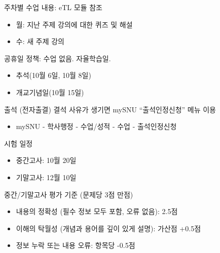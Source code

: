 \documentclass[11pt, aspectratio=169]{beamer}
\begin{document}
\begin{frame}[t]{}
  \begin{block}{주차별 수업 내용: eTL 모듈 참조}
    \begin{itemize}
      \item 월: 지난 주제 강의에 대한 퀴즈 및 해설
      \item 수: 새 주제 강의
    \end{itemize}     
  \end{block}

  \begin{block}{공휴일 정책: 수업 없음. 자율학습일.}
    \begin{itemize}
      \item 추석(10월 6일, 10월 8일)
      \item 개교기념일(10월 15일)
    \end{itemize}      
  \end{block}
  \begin{block}{출석 (전자출결)}
    결석 사유가 생기면 mySNU “출석인정신청” 메뉴 이용
    \begin{itemize}
      \item mySNU - 학사행정 - 수업/성적 - 수업 - 출석인정신청
    \end{itemize}
  \end{block}

\end{frame}

\begin{frame}[t]{}
    \begin{block}{시험 일정}
      \begin{itemize}
        \item 중간고사: 10월 20일
        \item 기말고사: 12월 10일
      \end{itemize}       
    \end{block}

  \begin{block}{중간/기말고사 평가 기준 (문제당 3점 만점)}
    \begin{itemize}
      \item 내용의 정확성 (필수 정보 모두 포함, 오류 없음): 2.5점
      \item 이해의 탁월성 (개념과 용어를 깊이 있게 설명): 가산점 +0.5점
      \item 정보 누락 또는 내용 오류: 항목당 -0.5점
    \end{itemize}
  \end{block}

\end{frame}
\end{document}
